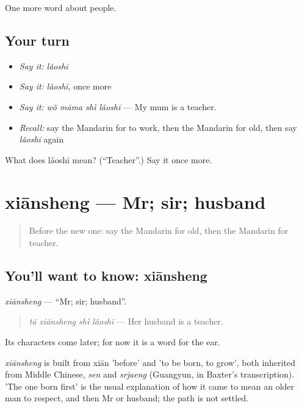 \begin{grammarlens}[title={What you've built}]
One more word about people.
\end{grammarlens}

\subsection*{Your turn}
\begin{itemize}
\raggedright
  \item \emph{Say it:} \emph{lǎoshī}
  \item \emph{Say it:} \emph{lǎoshī}, once more
  \item \emph{Say it:} \emph{wǒ māma shì lǎoshī} — My mum is a teacher.
  \item \emph{Recall:} say the Mandarin for to work, then the Mandarin for old, then say \emph{lǎoshī} again
\end{itemize}

\begin{tcolorbox}[breakable,colback=teal!4,colframe=teal!35!black,title={Before you move on}]
What does lǎoshī mean? (\textquotedblleft{}Teacher\textquotedblright{}.) Say it once more.
\end{tcolorbox}
\section[xiānsheng]{xiānsheng — Mr; sir; husband}

\label{lesson:ZH-C35-xiansheng}



\begin{quote}
Before the new one: say the Mandarin for old, then the Mandarin for teacher.
\end{quote}

\subsection*{You'll want to know: xiānsheng}
\emph{xiānsheng} — \textquotedblleft{}Mr; sir; husband\textquotedblright{}.

\begin{quote}
\emph{tā xiānsheng shì lǎoshī} — Her husband is a teacher.
\end{quote}

Its characters come later; for now it is a word for the ear.

\begin{cousinweb}
\emph{xiānsheng} is built from xiān 'before' and  'to be born, to grow', both inherited from Middle Chinese, \emph{sen} and \emph{srjaeng} (Guangyun, in Baxter's transcription). 'The one born first' is the usual explanation of how it came to mean an older man to respect, and then Mr or husband; the path is not settled.
\end{cousinweb}

